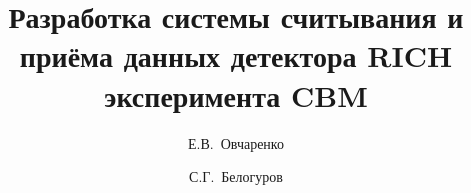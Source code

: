 \title{Разработка системы считывания и приёма данных детектора RICH эксперимента CBM}

\author{Е.В.~Овчаренко}
\author[1]{С.Г.~Белогуров}

